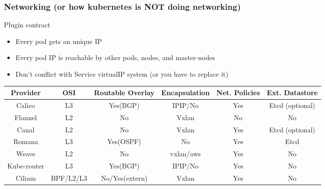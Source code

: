 \documentclass{beamer}
\begin{document}
\begin{frame}[fragile]
  \frametitle{Networking \footnotesize{(or how kubernetes is NOT doing networking)}}
  \begin{block}{Plugin contract}
    \begin{itemize}
      \item Every pod gets an unique IP
      \item Every pod IP is reachable by other pods, nodes, and master-nodes
      \item Don't conflict with Service virtualIP system (or you have to replace it)
    \end{itemize}
  \end{block}
  \scriptsize{
    \begin{table}
      \begin{tabular}{|c|c|c|c|c|c|} \hline
Provider    & OSI       & \tiny{Routable Overlay} & \tiny{Encapsulation} & \tiny{Net. Policies} & Ext. Datastore \\ \hline
Calico      & L3        & Yes(BGP)         & IPIP/No       & Yes              & Etcd (optional) \\ \hline
Flannel     & L2        & No               & Vxlan         & No               & No              \\ \hline
Canal       & L2        & No               & Vxlan         & Yes              & Etcd (optional) \\ \hline
Romana      & L3        & Yes(OSPF)        & No            & Yes              & Etcd            \\ \hline
Weave       & L2        & No               & vxlan/aws     & Yes              & No              \\ \hline
Kube-router & L3        & Yes(BGP)         & IPIP/No       & Yes              & No              \\ \hline
Cilium      & BPF/L2/L3 & No/Yes(extern)   & Vxlan         & Yes              & No              \\ \hline
      \end{tabular}
    \end{table}
  }
\end{frame}
\end{document}
